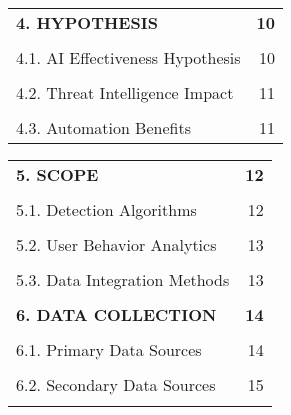 \documentclass[12pt]{article}
\begin{document}
\begin{spacing}{1.0}
\begin{tabular}{@{} p{} r @{}}
\textbf{4. HYPOTHESIS} & \textbf{10} \\
\vspace{0.1cm} & \\
\hspace{1em}4.1. AI Effectiveness Hypothesis & 10 \\
\vspace{0.1cm} & \\
\hspace{1em}4.2. Threat Intelligence Impact & 11 \\
\vspace{0.1cm} & \\
\hspace{1em}4.3. Automation Benefits & 11 \\
\end{tabular}

\newpage
\begin{tabular}{@{} p{} r @{}}
\textbf{5. SCOPE} & \textbf{12} \\
\vspace{0.1cm} & \\
\hspace{1em}5.1. Detection Algorithms & 12 \\
\vspace{0.1cm} & \\
\hspace{1em}5.2. User Behavior Analytics & 13 \\
\vspace{0.1cm} & \\
\hspace{1em}5.3. Data Integration Methods & 13 \\
\vspace{0.2cm} & \\

\textbf{6. DATA COLLECTION} & \textbf{14} \\
\vspace{0.1cm} & \\
\hspace{1em}6.1. Primary Data Sources & 14 \\
\vspace{0.1cm} & \\
\hspace{1em}6.2. Secondary Data Sources & 15 \\
\vspace{0.2cm} & \\


\end{tabular}
\end{spacing}
\end{document}
